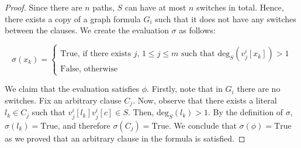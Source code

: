 \documentclass[en]{pracamgr}
\theoremstyle{definition}
\newcommand{\degree}[2]{\textrm{deg}_{#1}(#2)}
\newcommand{\true}{\textrm{True}}
\begin{document}
\begin{proof}
	Since there are $n$ paths, $S$ can have at most $n$ switches in total. Hence, there exists a copy of a graph formula $G_i$ such that it does not have any switches between the clauses. We create the evaluation $\sigma$ as follows:
	
	\begin{equation*}
	\sigma(x_k) = 
	\begin{cases}
	\textrm{True}\text{, if there exists $j$, $1 \leq j \leq m$ such that $\degree{S}{v^i_j[x_k]} > 1$} \\
	\textrm{False}\text{, otherwise}
	\end{cases}
	\end{equation*}
	
	\noindent
	We claim that the evaluation satisfies $\phi$. Firstly, note that in $G_i$ there are no switches. Fix an arbitrary clause $C_j$. Now, observe that there exists a literal $l_k \in C_j$ such that $v^i_j[l_k]v^i_j[c] \in S$. Then, $\degree{S}{l_k}>1$. By the definition of $\sigma$, $\sigma(l_k)=\true$, and therefore $\sigma(C_j)=\true$. We conclude that $\sigma(\phi)=\true$ as we proved that an arbitrary clause in the formula is satisfied.\qedhere
	
\end{proof}
\end{document}
